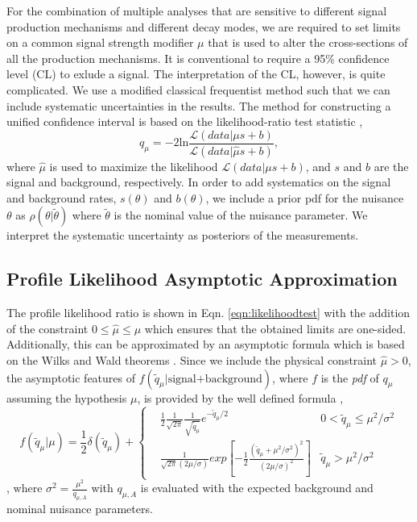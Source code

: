 For the combination of multiple analyses that are sensitive to different signal production mechanisms and different decay modes, we are required to set limits on a common signal strength modifier $\mu$ that is used to alter the cross-sections of all the production mechanisms. It is conventional to require a 95\% confidence level (CL) to exlude a signal. The interpretation of the CL, however, is quite complicated. We use a modified classical frequentist method such that we can include systematic uncertainties in the results. The method for constructing a unified confidence interval is based on the likelihood-ratio test statistic \cite{feldman_unified_1998}, 
\begin{equation}\label{eqn:likelihoodtest}
q_\mu=-2\text{ln}\frac{\mathcal{L}(data|\mu s+b)}{\mathcal{L}(data|\hat{\mu} s+b)},
\end{equation}
where $\hat{\mu}$ is used to maximize the likelihood $\mathcal{L}(data|\mu s+b)$, and $s$ and $b$ are the signal and background, respectively. In order to add systematics on the signal and background rates, $s(\theta)$ and $b(\theta)$, we include a prior pdf for the nuisance $\theta$ as $\rho(\theta|\widetilde{\theta})$ where $\widetilde{\theta}$ is the nominal value of the nuisance parameter. We interpret the systematic uncertainty as posteriors of the measurements. 

\subsection{Profile Likelihood Asymptotic Approximation}\label{subsec:Asymptotic}

The profile likelihood ratio is shown in Eqn. \ref{eqn:likelihoodtest} with the addition of the constraint $0\leq\widehat{\mu}\leq\mu$ which ensures that the obtained limits are one-sided. Additionally, this can be approximated by an asymptotic formula which is based on the Wilks and Wald theorems \cite{cowan_asymptotic_2011}. Since we include the physical constraint $\widehat{\mu}>0$, the asymptotic features of $f(\widetilde{q}_\mu|\text{signal+background})$, where $f$ is the \textit{pdf} of $q_\mu$ assuming the hypothesis $\mu$, is provided by the well defined formula \cite{cowan_asymptotic_2011}, 
\begin{equation}\label{eqn:profileLikelihood}
f(\widetilde{q}_\mu|\mu)=\frac{1}{2}\delta(\widetilde{q}_\mu)+\left\{
\begin{split}
&\frac{1}{2}\frac{1}{\sqrt{2\pi}}\frac{1}{\sqrt{\widetilde{q}_\mu}}e^{-\widetilde{q}_\mu/2} & 0<\widetilde{q}_\mu\leq\mu^2/\sigma^2 \\
&\frac{1}{\sqrt{2\pi}(2\mu/\sigma)}exp[-\frac{1}{2}\frac{(\widetilde{q}_\mu+\mu^2/\sigma^2)^2}{(2\mu/\sigma)^2}] & \widetilde{q}_\mu>\mu^2/\sigma^2
\end{split}
\end{equation},
where $\sigma^2=\frac{\mu^2}{q_{\mu,A}}$ with $q_{\mu,A}$ is evaluated with the expected background and nominal nuisance parameters. 

